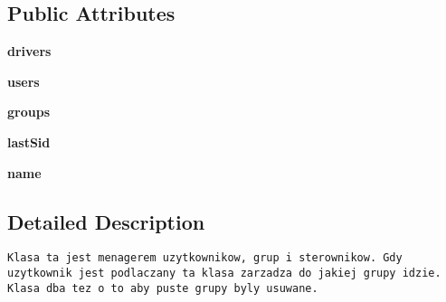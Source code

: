 \subsection*{Public Attributes}
\begin{CompactItemize}
\item 
\hypertarget{class_serv_1_1_user_group_manager_1_1_user_group_manager_00aa453d586337ce2692166c666a1817}{
\textbf{drivers}}
\label{class_serv_1_1_user_group_manager_1_1_user_group_manager_00aa453d586337ce2692166c666a1817}

\item 
\hypertarget{class_serv_1_1_user_group_manager_1_1_user_group_manager_b41620628a204c943cd30a8f836eddd0}{
\textbf{users}}
\label{class_serv_1_1_user_group_manager_1_1_user_group_manager_b41620628a204c943cd30a8f836eddd0}

\item 
\hypertarget{class_serv_1_1_user_group_manager_1_1_user_group_manager_4da728a66a4115432bdc2057fd3e92fa}{
\textbf{groups}}
\label{class_serv_1_1_user_group_manager_1_1_user_group_manager_4da728a66a4115432bdc2057fd3e92fa}

\item 
\hypertarget{class_serv_1_1_user_group_manager_1_1_user_group_manager_97c7d967f8ebfe883963ff38bee5ecaf}{
\textbf{lastSid}}
\label{class_serv_1_1_user_group_manager_1_1_user_group_manager_97c7d967f8ebfe883963ff38bee5ecaf}

\item 
\hypertarget{class_serv_1_1_user_group_manager_1_1_user_group_manager_c2e922b108e77474d9daab6be8055436}{
\textbf{name}}
\label{class_serv_1_1_user_group_manager_1_1_user_group_manager_c2e922b108e77474d9daab6be8055436}

\end{CompactItemize}


\subsection{Detailed Description}


\footnotesize\begin{verbatim}Klasa ta jest menagerem uzytkownikow, grup i sterownikow. Gdy uzytkownik jest podlaczany ta klasa zarzadza do jakiej grupy idzie.
Klasa dba tez o to aby puste grupy byly usuwane.

\end{verbatim}
\normalsize
 

